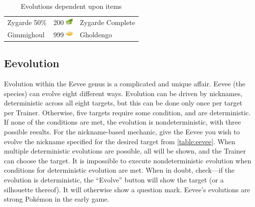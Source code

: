 \begin{table}
\begin{tabular}{lll}
    Zygarde 50\% & 200 \includegraphics[width=1em,height=1em]{images/zygardecell.png} & Zygarde Complete \\
    Gimmighoul & 999 \includegraphics[width=1em,height=1em]{images/gcoin.png} & Gholdengo \\
  \end{tabular}
\caption{Evolutions dependent upon items}
\label{table:itemevolutions}
\end{table}

\subsection{Eevolution}
\begin{figure}
\end{figure}
Evolution within the Eevee genus is a complicated and unique affair.
Eevee (the species) can evolve eight different ways.
Evolution can be driven by nicknames, deterministic across all eight targets,
  but this can be done only once per target per Trainer.
Otherwise, five targets require some condition, and are deterministic.
If none of the conditions are met, the evolution is nondeterministic,
  with three possible results.
For the nickname-based mechanic, give the Eevee you wish to evolve the nickname
  specified for the desired target from \autoref{table:eevee}.
When multiple deterministic evolutions are possible, all will be shown,
  and the Trainer can choose the target.
It is impossible to execute nondeterministic evolution when conditions for deterministic evolution are met.
When in doubt, check---if the evolution is deterministic, the ``Evolve'' button will show the target (or a silhouette thereof).
It will otherwise show a question mark.
Eevee's evolutions are strong Pokémon in the early game.
